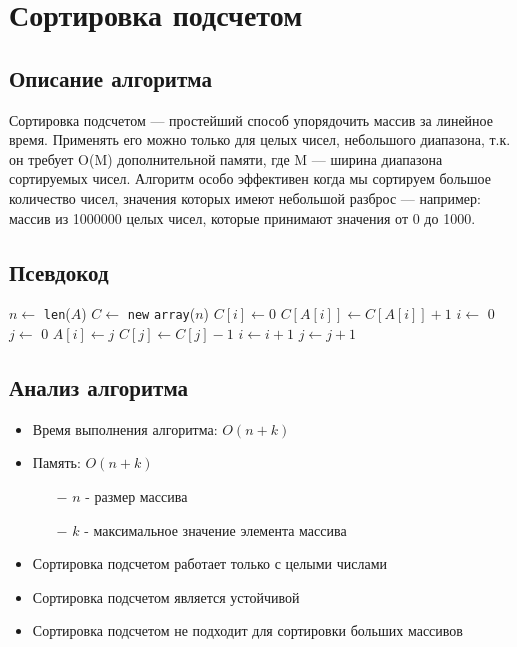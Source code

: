 \section{Сортировка подсчетом}

\subsection{Описание алгоритма}

Сортировка подсчетом — простейший способ упорядочить массив за линейное время.
Применять его можно только для целых чисел, небольшого диапазона,
т.к. он требует O(M) дополнительной памяти,
где M — ширина диапазона сортируемых чисел.
Алгоритм особо эффективен когда мы сортируем большое количество чисел,
значения которых имеют небольшой разброс — например: массив из 1000000 целых чисел,
которые принимают значения от 0 до 1000.\cite{countingsort-ref}

\subsection{Псевдокод}

\begin{algorithmic}
\State $n \gets$ \texttt{len}($A$)
\State $C \gets$ \texttt{new} \texttt{array}($n$)
\State $C[i] \gets 0$
\EndFor
{}
\State $C[A[i]] \gets C[A[i]] + 1$
\EndFor
\State $i \gets$ 0
\State $j \gets$ 0
\State $A[i] \gets j$
\State $C[j] \gets C[j] - 1$
\State $i \gets i + 1$
\Else
\State $j \gets j + 1$
\EndIf
\EndWhile
\EndProcedure
\end{algorithmic}

\subsection{Анализ алгоритма}

\begin{itemize}
    \item Время выполнения алгоритма: $O(n + k)$
    \item Память: $O(n + k)$
    \begin{itemize}
        \item[$-$] $n$ - размер массива
        \item[$-$] $k$ - максимальное значение элемента массива
    \end{itemize}
    \item Сортировка подсчетом работает только с целыми числами
    \item Сортировка подсчетом является устойчивой
    \item Сортировка подсчетом не подходит для сортировки больших массивов
\end{itemize}

